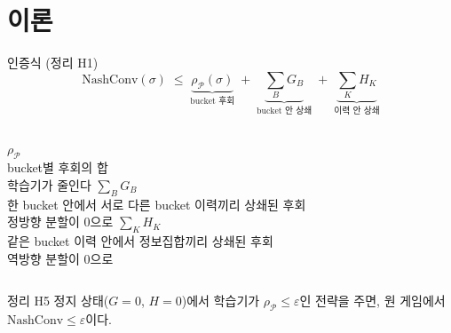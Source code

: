 \documentclass[aspectratio=169,11pt]{beamer}
\newcommand{\Pc}{\mathcal P}
\begin{document}
\section{이론}
\begin{frame}{인증식 (정리 H1)}
\[
\mathrm{NashConv}(\sigma)\;\le\;
\underbrace{\rho_{\Pc}(\sigma)}_{\text{bucket 후회}}
\;+\;\underbrace{\textstyle\sum_B G_B}_{\text{bucket 안 상쇄}}
\;+\;\underbrace{\textstyle\sum_K H_K}_{\text{이력 안 상쇄}}
\]
\vspace{2pt}
\begin{columns}[T,onlytextwidth]
\textbf{$\rho_{\Pc}$}\\
{\small bucket별 후회의 합}\\
{\small\color{muted} 학습기가 줄인다}
\textbf{\textcolor{deepblue}{$\sum_B G_B$}}\\
{\small 한 bucket 안에서 서로 다른 bucket 이력끼리 상쇄된 후회}\\
{\small\color{muted} 정방향 분할이 0으로}
\textbf{\textcolor{deeporange}{$\sum_K H_K$}}\\
{\small 같은 bucket 이력 안에서 정보집합끼리 상쇄된 후회}\\
{\small\color{muted} 역방향 분할이 0으로}
\end{columns}
\vspace{10pt}
\begin{exampleblock}{정리 H5}
\small 정지 상태($G=0$, $H=0$)에서 학습기가 $\rho_{\Pc}\le\varepsilon$인 전략을 주면, 원 게임에서 $\mathrm{NashConv}\le\varepsilon$이다.
\end{exampleblock}
\end{frame}
\end{document}
